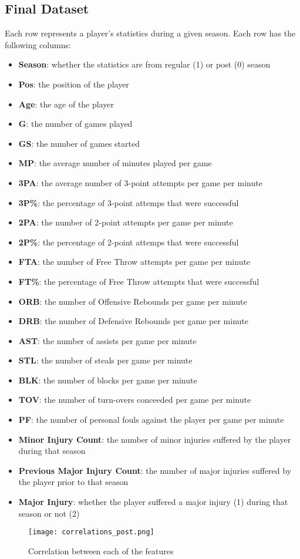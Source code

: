\documentclass{article}
\begin{document}
\subsection*{Final Dataset}

\label{appendix:finaldataset}Each row represents a player's statistics during a given season. 
Each row has the following columns:
\begin{itemize}
    \item \textbf{Season}: whether the statistics are from regular (1) or post (0) season
    \item \textbf{Pos}: the position of the player
    \item \textbf{Age}: the age of the player
    \item \textbf{G}: the number of games played
    \item \textbf{GS}: the number of games started
    \item \textbf{MP}: the average number of minutes played per game
    \item \textbf{3PA}: the average number of 3-point attempts per game per minute
    \item \textbf{3P\%}: the percentage of 3-point attemps that were successful
    \item \textbf{2PA}: the number of 2-point attempts per game per minute
    \item \textbf{2P\%}: the percentage of 2-point attemps that were successful
    \item \textbf{FTA}: the number of Free Throw attempts per game per minute
    \item \textbf{FT\%}: the percentage of Free Throw attempts that were successful
    \item \textbf{ORB}: the number of Offensive Rebounds per game per minute
    \item \textbf{DRB}: the number of Defensive Rebounds per game per minute
    \item \textbf{AST}: the number of assists per game per minute
    \item \textbf{STL}: the number of steals per game per minute
    \item \textbf{BLK}: the number of blocks per game per minute
    \item \textbf{TOV}: the number of turn-overs conceeded per game per minute
    \item \textbf{PF}: the number of personal fouls against the player per game per minute
    \item \textbf{Minor Injury Count}: the number of minor injuries suffered by the player during that season
    \item \textbf{Previous Major Injury Count}: the number of major injuries suffered by the player prior to that season
    \item \textbf{Major Injury}: whether the player suffered a major injury (1) during that season or not (2)
\end{itemize}

\newpage
\begin{figure}
    \caption{\label{appendix:correlations}Correlation between each of the features}
    \centering
    \texttt{[image: correlations\_post.png]}
\end{figure}
\newpage
\end{document}
